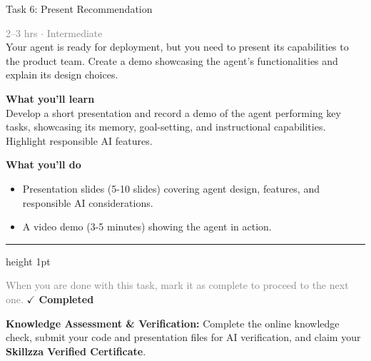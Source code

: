 \documentclass[10pt,a4paper]{article}
\begin{document}
\begin{taskbox}{Task 6: Present Recommendation}

    {\small \textcolor{gray}{2--3 hrs $\cdot$ Intermediate}}\\[12pt]

      
Your agent is ready for deployment, but you need to present its capabilities to the product team. Create a demo showcasing the agent's functionalities and explain its design choices.


\vspace{8pt}
{\large \textbf{\textcolor{brandLight}{What you'll learn}}}\\[4pt]  
Develop a short presentation and record a demo of the agent performing key tasks, showcasing its memory, goal-setting, and instructional capabilities. Highlight responsible AI features.

\vspace{8pt}
{\large \textbf{\textcolor{brandLight}{What you'll do}}}\\[4pt]  
\begin{itemize}
    \item Presentation slides (5-10 slides) covering agent design, features, and responsible AI considerations.  
    \item A video demo (3-5 minutes) showing the agent in action.\par
\end{itemize}

    \vspace{16pt}

    \textcolor{cardBorder}{\hrule height 1pt}\vspace{8pt}

    \small \textcolor{gray}{When you are done with this task, mark it as complete to proceed to the next one.} \hfill \textbf{\textcolor{brandDark}{$\checkmark$ Completed}}

\end{taskbox}

\begin{completionbox}
    \textbf{Knowledge Assessment \& Verification:} Complete the online knowledge check, submit your code and presentation files for AI verification, and claim your \textbf{Skillzza Verified Certificate}.
\end{completionbox}

\newpage


\end{document}
